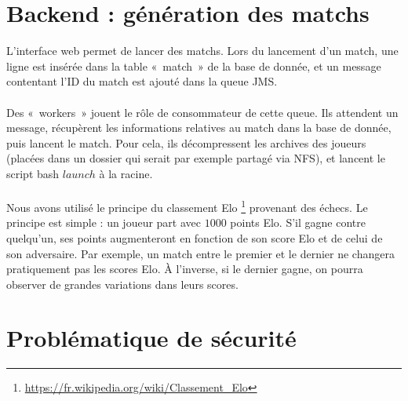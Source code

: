 \documentclass[10pt]{scrartcl}
\begin{document}
\section{Backend : génération des matchs}
  L'interface web permet de lancer des matchs. Lors du lancement d'un
  match, une ligne est insérée dans la table «~match~» de la base de
  donnée, et un message contentant l'ID du match est ajouté dans la
  queue JMS.

  \paragraph{}
  Des «~workers~» jouent le rôle de consommateur de cette queue. Ils
  attendent un message, récupèrent les informations relatives au match
  dans la base de donnée, puis lancent le match. Pour cela, ils décompressent
  les archives des joueurs (placées dans un dossier qui serait par exemple partagé
  via NFS), et lancent le script bash $launch$ à la racine.

  \paragraph{}
  Nous avons utilisé le principe du classement Elo
  \footnote{\url{https://fr.wikipedia.org/wiki/Classement\_Elo}} provenant
  des échecs. Le principe est simple : un joueur part avec $1000$ points Elo.
  S'il gagne contre quelqu'un, ses points augmenteront en fonction de son
  score Elo et de celui de son adversaire. Par exemple, un match entre le
  premier et le dernier ne changera pratiquement pas les scores Elo. À l'inverse,
  si le dernier gagne, on pourra observer de grandes variations dans leurs scores.

\section{Problématique de sécurité}
\end{document}
